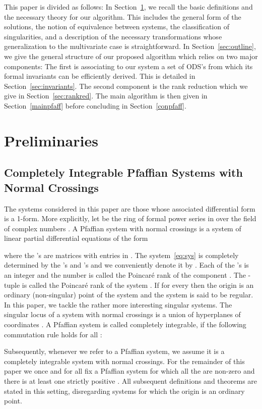 \documentclass[final,1p,times,number,amsthm]{elsart}
\begin{document}
This paper is divided as follows: In Section~\ref{sec:prelim}, we recall the
basic definitions and the necessary theory for our algorithm. This includes the
general form of the solutions, the notion of equivalence between systems, the
classification of singularities, and a description of the necessary
transformations whose generalization to the multivariate case is
straightforward. In Section~\ref{sec:outline}, we give the general structure of
our proposed algorithm which relies on two major components: The first is
associating to our system a set of ODS's from which its formal invariants can be
efficiently derived. This is detailed in Section~\ref{sec:invariants}. The
second component is the rank reduction which we give in
Section~\ref{sec:rankred}. The main algorithm is then given in
Section~\ref{mainpfaff} before concluding in Section~\ref{conpfaff}.

\section{Preliminaries}
\label{sec:prelim}
\subsection{Completely Integrable Pfaffian Systems with Normal Crossings}
\label{sec:prelimpfaff}
The systems considered in this paper are those whose associated differential
form is a 1-form. More explicitly, let  be the ring of
formal power series in  over the field of complex numbers
. A Pfaffian system with normal crossings is a system of linear partial
differential equations of the form

where the 's are  matrices with entries in .  The
system~\eqref{eq:sys} is completely determined by the 's and 's and we
conveniently denote it by . Each of the 's is an integer and the
number  is called the Poincar\'e rank of the 
component .  The -tuple
 is called the Poincar\'e rank of the system .
If  for every  then the origin is an
ordinary (non-singular) point of the system and the system is said to be
regular. In this paper, we tackle the rather more interesting singular
systems. The singular locus of a system with normal crossings is a union of
hyperplanes of coordinates . A Pfaffian system is called
completely integrable, if the following commutation rule holds for all
:

Subsequently, whenever we refer to a Pfaffian system, we assume it is a
completely integrable system with normal crossings. For the remainder of this
paper we once and for all fix a Pfaffian system  for which all the 
are non-zero and there is at least one strictly positive . All subsequent
definitions and theorems are stated in this setting, disregarding systems for
which the origin is an ordinary point.
\end{document}
